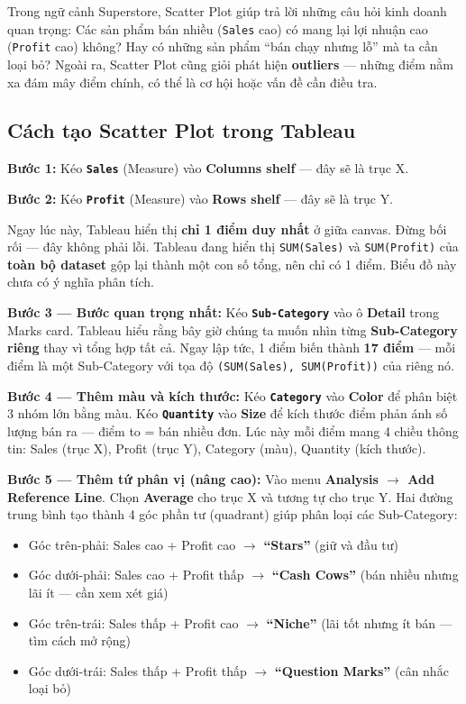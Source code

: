 \documentclass[12pt]{article}
\begin{document}
\noindent Trong ngữ cảnh Superstore, Scatter Plot giúp trả lời những câu hỏi kinh doanh quan trọng: Các sản phẩm bán nhiều (\texttt{Sales} cao) có mang lại lợi nhuận cao (\texttt{Profit} cao) không? Hay có những sản phẩm ``bán chạy nhưng lỗ'' mà ta cần loại bỏ? Ngoài ra, Scatter Plot cũng giỏi phát hiện \textbf{outliers} --- những điểm nằm xa đám mây điểm chính, có thể là cơ hội hoặc vấn đề cần điều tra.

\subsection{Cách tạo Scatter Plot trong Tableau}

\noindent \textbf{Bước 1:} Kéo \textbf{\texttt{Sales}} (Measure) vào \textbf{Columns shelf} --- đây sẽ là trục X.

\noindent \textbf{Bước 2:} Kéo \textbf{\texttt{Profit}} (Measure) vào \textbf{Rows shelf} --- đây sẽ là trục Y.

\noindent Ngay lúc này, Tableau hiển thị \textbf{chỉ 1 điểm duy nhất} ở giữa canvas. Đừng bối rối --- đây không phải lỗi. Tableau đang hiển thị \texttt{SUM(Sales)} và \texttt{SUM(Profit)} của \textbf{toàn bộ dataset} gộp lại thành một con số tổng, nên chỉ có 1 điểm. Biểu đồ này chưa có ý nghĩa phân tích.

\noindent \textbf{Bước 3 --- Bước quan trọng nhất:} Kéo \textbf{\texttt{Sub-Category}} vào ô \textbf{Detail} trong Marks card. Tableau hiểu rằng bây giờ chúng ta muốn nhìn từng \textbf{Sub-Category riêng} thay vì tổng hợp tất cả. Ngay lập tức, 1 điểm biến thành \textbf{17 điểm} --- mỗi điểm là một Sub-Category với tọa độ \texttt{(SUM(Sales), SUM(Profit))} của riêng nó.

\noindent \textbf{Bước 4 --- Thêm màu và kích thước:} Kéo \textbf{\texttt{Category}} vào \textbf{Color} để phân biệt 3 nhóm lớn bằng màu. Kéo \textbf{\texttt{Quantity}} vào \textbf{Size} để kích thước điểm phản ánh số lượng bán ra --- điểm to = bán nhiều đơn. Lúc này mỗi điểm mang 4 chiều thông tin: Sales (trục X), Profit (trục Y), Category (màu), Quantity (kích thước).

\noindent \textbf{Bước 5 --- Thêm tứ phân vị (nâng cao):} Vào menu \textbf{Analysis $\rightarrow$ Add Reference Line}. Chọn \textbf{Average} cho trục X và tương tự cho trục Y. Hai đường trung bình tạo thành 4 góc phần tư (quadrant) giúp phân loại các Sub-Category:
\begin{itemize}[nosep]
    \item Góc trên-phải: Sales cao + Profit cao $\rightarrow$ \textbf{``Stars''} (giữ và đầu tư)
    \item Góc dưới-phải: Sales cao + Profit thấp $\rightarrow$ \textbf{``Cash Cows''} (bán nhiều nhưng lãi ít --- cần xem xét giá)
    \item Góc trên-trái: Sales thấp + Profit cao $\rightarrow$ \textbf{``Niche''} (lãi tốt nhưng ít bán --- tìm cách mở rộng)
    \item Góc dưới-trái: Sales thấp + Profit thấp $\rightarrow$ \textbf{``Question Marks''} (cân nhắc loại bỏ)
\end{itemize}
\end{document}
